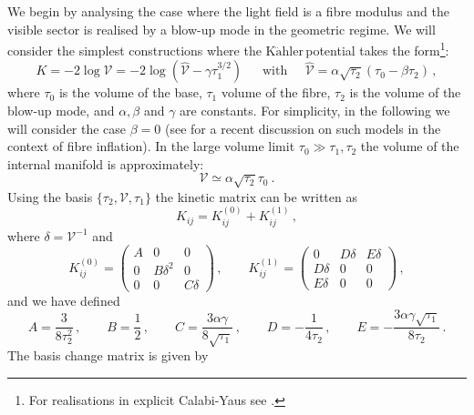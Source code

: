 \documentclass[11pt,a4paper]{article}
\newcommand{\V}{\mathcal{V}}
\newcommand{\Kahler}{\ensuremath{\text{K}\ddot{\text{a}}\text{hler}\,}}
\begin{document}
We begin by analysing the case where the light field is a fibre modulus and the visible sector is realised by a blow-up mode in the geometric regime. We will consider the simplest constructions where the \Kahler potential takes the form\footnote{For realisations in explicit Calabi-Yaus see \cite{Cicoli:2011it}.}:
\begin{equation}
\label{fib}
  K = -2 \log \V = - 2 \log \left(\hat{\V}  -  \gamma \tau_1^{3/2}\right) \,  \phantom{abc} { \text{with}}  \phantom{abc} \hat{\V}  = \alpha \sqrt{\tau_2} \left( \tau_0 - \beta \tau_2 \right) \,,
\end{equation}
%
where $\tau_0$ is the volume of the base, $\tau_1$ volume of the fibre, $\tau_2$ is the volume of the blow-up mode, and $\alpha, \beta$ and $\gamma$ are constants. For simplicity, in the following we will consider the case $\beta = 0$ (see \cite{Burgess:2016owb} for a recent discussion on such models in the context of fibre inflation). In the large volume limit $\tau_{0} \gg \tau_1, \tau_2$ the volume of the internal manifold is approximately: 
%
\begin{equation}
\V \simeq \alpha \sqrt{\tau_2} \tau_0 \ . 
\end{equation}
%
Using the basis $\{\tau_2, \V, \tau_1\}$ the kinetic matrix can be written as
\begin{equation}
K_{ij} = K^{(0)}_{ij} + K^{(1)}_{ij} \,,
\end{equation}
 where $\delta = \V^{-1}$ and
\begin{equation}
K_{ij}^{(0)} = \begin{pmatrix}
A & 0 & 0 \\
0 & B \delta^2 & 0 \\
0 & 0 & C \delta
\end{pmatrix} \,, \qquad
K_{ij}^{(1)} = \begin{pmatrix}
0 & D \delta & E \delta \\
D \delta & 0 & 0 \\
E \delta & 0 & 0
\end{pmatrix} \,,
\end{equation}
and we have defined
\begin{equation}
A = \frac{3}{8 \tau_2^2} \,, \qquad B = \frac{1}{2} \,, \qquad C = \frac{3 \alpha \gamma}{8 \sqrt{\tau_1}} \,, \qquad D = - \frac{1}{4 \tau_2} \,, \qquad E = - \frac{3 \alpha \gamma \sqrt{\tau_1}}{8 \tau_2} \,.
\end{equation}
The basis change matrix is given by
\end{document}
